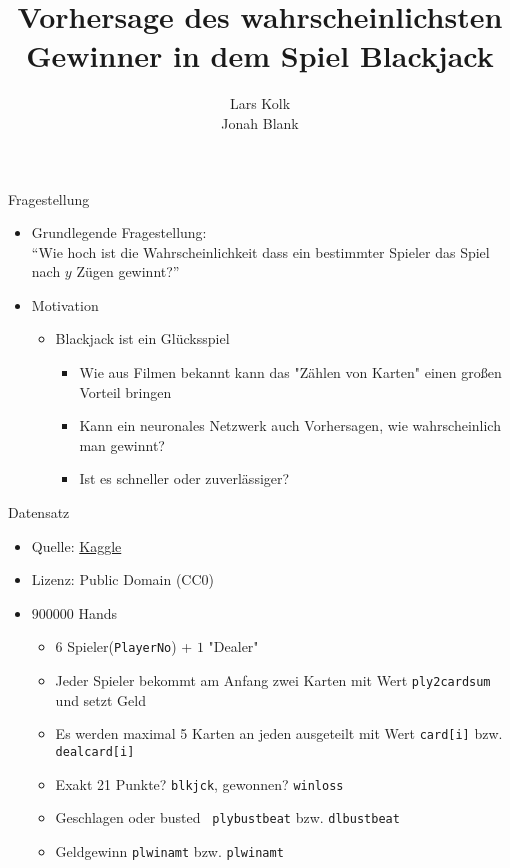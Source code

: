 \documentclass[aspectratio=1610, 9pt]{beamer}
\title{Vorhersage des wahrscheinlichsten Gewinner in dem Spiel Blackjack}
\author[L.~Kolk,~J.~Blank]{Lars Kolk\\ Jonah Blank}
\institute[ML-Seminar]{\\[0.3cm]TU Dortmund \\ \Large ML-Seminar}
\begin{document}
\maketitle


\begin{frame}{Fragestellung}
\begin{itemize}
  \item Grundlegende Fragestellung:\\
  \rightarrow{} ``Wie hoch ist die Wahrscheinlichkeit dass ein bestimmter Spieler das Spiel nach $y$ Zügen gewinnt?''
  \vspace{0.5cm}
  \item Motivation
  \begin{itemize}
    \item Blackjack ist ein Glücksspiel
    \begin{itemize}
      \item Wie aus Filmen bekannt kann das "Zählen von Karten" einen großen Vorteil bringen
      \item Kann ein neuronales Netzwerk auch Vorhersagen, wie wahrscheinlich man gewinnt?
      \item Ist es schneller oder zuverlässiger?
    \end{itemize}
  \end{itemize}
\end{itemize}
\end{frame}


\begin{frame}{Datensatz}
    \begin{itemize}
    \item Quelle: \href{https://www.kaggle.com/mojocolors/900000-hands-of-blackjack-results}{Kaggle}
    \item Lizenz: Public Domain (CC0)
    \item $900000$ Hands
    \begin{itemize}
    \item $6$ Spieler(\texttt{PlayerNo}) + $1$ "Dealer"
	   \item Jeder Spieler bekommt am Anfang zwei Karten mit Wert \texttt{ply2cardsum} und setzt Geld 
    \item Es werden maximal 5 Karten an jeden ausgeteilt mit Wert \texttt{card[i]} bzw. \texttt{dealcard[i]}
    \item Exakt 21 Punkte? \texttt{blkjck}, gewonnen? \texttt{winloss}
    \item Geschlagen oder \glqq busted \grqq\, \texttt{plybustbeat} bzw. \texttt{dlbustbeat}
    \item Geldgewinn \texttt{plwinamt} bzw. \texttt{plwinamt}
    \end{itemize}
    \end{itemize}
\end{frame}
\end{document}
